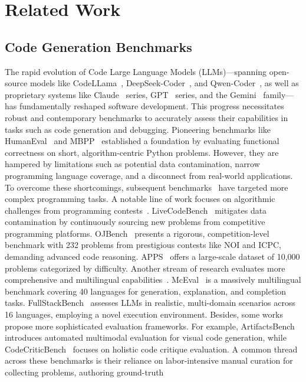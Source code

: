 \section{Related Work}

\subsection{Code Generation Benchmarks}
The rapid evolution of Code Large Language Models (LLMs)—spanning open-source models like CodeLLama~\citep{roziere2023code}, DeepSeek-Coder~\citep{zhu2024deepseek}, and Qwen-Coder~\citep{hui2024qwen2}, as well as proprietary systems like Claude~\citep{claude4} series, GPT~\citep{gpt4o,GPT-4.1} series, and the Gemini~\citep{gemini2.5} family—has fundamentally reshaped software development. This progress necessitates robust and contemporary benchmarks to accurately assess their capabilities in tasks such as code generation and debugging. Pioneering benchmarks like HumanEval~\citep{chen2021evaluatinglargelanguagemodels} and MBPP~\citep{austin2021programsynthesislargelanguage} established a foundation by evaluating functional correctness on short, algorithm-centric Python problems. However, they are hampered by limitations such as potential data contamination, narrow programming language coverage, and a disconnect from real-world applications. To overcome these shortcomings, subsequent benchmarks~\citep{jimenez2024swebench,jain2025livecodebench,wang2025ojbench,guo2025codeeditorbenchevaluatingcodeediting,zhang2025codecriticbenchholisticcodecritique,zhang2025artifactsbench} have targeted more complex programming tasks. A notable line of work focuses on algorithmic challenges from programming contests~\citep{hendrycks2021measuring,Li_2022,jain2025livecodebench,wang2025ojbench,zheng2025livecodebenchproolympiadmedalists}. LiveCodeBench~\citep{jain2025livecodebench} mitigates data contamination by continuously sourcing new problems from competitive programming platforms. OJBench~\citep{wang2025ojbench} presents a rigorous, competition-level benchmark with 232 problems from prestigious contests like NOI and ICPC, demanding advanced code reasoning. APPS~\citep{hendrycks2021measuring} offers a large-scale dataset of 10,000 problems categorized by difficulty. Another stream of research evaluates more comprehensive and multilingual capabilities~\citep{cassano2022multiplescalableextensibleapproach,peng2024humanevalxlmultilingualcodegeneration,zhang2024naturalcodebenchexaminingcodingperformance,chai2025mceval,fullstackbench}. McEval~\citep{chai2025mceval} is a massively multilingual benchmark covering 40 languages for generation, explanation, and completion tasks. FullStackBench~\citep{fullstackbench} assesses LLMs in realistic, multi-domain scenarios across 16 languages, employing a novel execution environment. Besides, some works propose more sophisticated evaluation frameworks. For example, ArtifactsBench~\citep{zhang2025artifactsbench} introduces automated multimodal evaluation for visual code generation, while CodeCriticBench~\citep{zhang2025codecriticbenchholisticcodecritique} focuses on holistic code critique evaluation. A common thread across these benchmarks is their reliance on labor-intensive manual curation for collecting problems, authoring ground-truth 